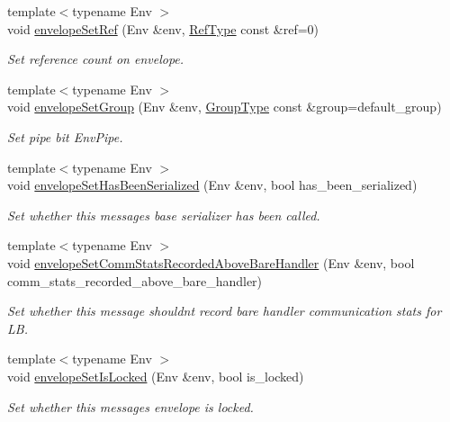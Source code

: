 \begin{DoxyCompactItemize}
{\footnotesize template$<$typename Env $>$ }\\void \hyperlink{namespacevt_a43dd08b8f10d3a1c79872a759aa11662}{envelope\+Set\+Ref} (Env \&env, \hyperlink{namespacevt_a9b39ce9494bb04674d0d5b895a5aa50f}{Ref\+Type} const \&ref=0)
\begin{DoxyCompactList}\small\item\em Set reference count on envelope. \end{DoxyCompactList}\item 
{\footnotesize template$<$typename Env $>$ }\\void \hyperlink{namespacevt_a9f9d4ce6034c0eaaf98bdffd33d0e1c7}{envelope\+Set\+Group} (Env \&env, \hyperlink{namespacevt_a27b5e4411c9b6140c49100e050e2f743}{Group\+Type} const \&group=default\+\_\+group)
\begin{DoxyCompactList}\small\item\em Set pipe bit {\ttfamily Env\+Pipe}. \end{DoxyCompactList}\item 
{\footnotesize template$<$typename Env $>$ }\\void \hyperlink{namespacevt_a32c449c2c4c6e0806cdab6798e275c03}{envelope\+Set\+Has\+Been\+Serialized} (Env \&env, bool has\+\_\+been\+\_\+serialized)
\begin{DoxyCompactList}\small\item\em Set whether this message\textquotesingle{}s base serializer has been called. \end{DoxyCompactList}\item 
{\footnotesize template$<$typename Env $>$ }\\void \hyperlink{namespacevt_a959f80af60beb5a12e9b3bce1a80caf8}{envelope\+Set\+Comm\+Stats\+Recorded\+Above\+Bare\+Handler} (Env \&env, bool comm\+\_\+stats\+\_\+recorded\+\_\+above\+\_\+bare\+\_\+handler)
\begin{DoxyCompactList}\small\item\em Set whether this message shouldn\textquotesingle{}t record bare handler communication stats for LB. \end{DoxyCompactList}\item 
{\footnotesize template$<$typename Env $>$ }\\void \hyperlink{namespacevt_aeda768e2b7668340d73e5254a6b2923f}{envelope\+Set\+Is\+Locked} (Env \&env, bool is\+\_\+locked)
\begin{DoxyCompactList}\small\item\em Set whether this message\textquotesingle{}s envelope is locked. \end{DoxyCompactList}\item 

\end{DoxyCompactItemize}
